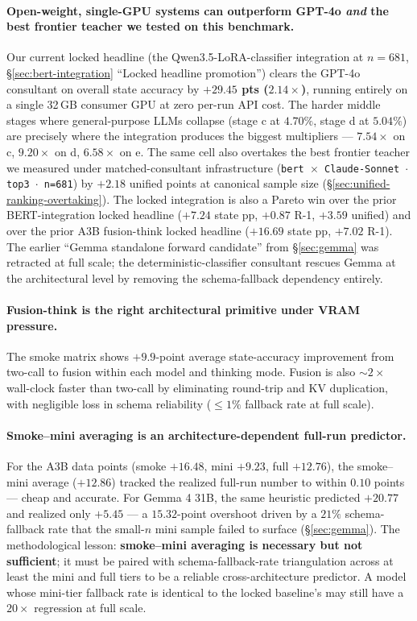 \documentclass[11pt]{article}
\begin{document}
\paragraph{Open-weight, single-GPU systems can outperform GPT-4o \emph{and} the best frontier teacher we tested on this benchmark.} Our current locked headline (the Qwen3.5-LoRA-classifier integration at $n{=}681$, \S\ref{sec:bert-integration} ``Locked headline promotion'') clears the GPT-4o consultant on overall state accuracy by \textbf{$+29.45$ pts ($2.14\times$)}, running entirely on a single 32\,GB consumer GPU at zero per-run API cost. The harder middle stages where general-purpose LLMs collapse (stage c at $4.70\%$, stage d at $5.04\%$) are precisely where the integration produces the biggest multipliers --- $\boldsymbol{7.54\times}$ on c, $\boldsymbol{9.20\times}$ on d, $6.58\times$ on e. The same cell also overtakes the best frontier teacher we measured under matched-consultant infrastructure (\texttt{bert $\times$ Claude-Sonnet $\cdot$ top3 $\cdot$ n=681}) by $\boldsymbol{+2.18}$ unified points at canonical sample size (\S\ref{sec:unified-ranking-overtaking}). The locked integration is also a Pareto win over the prior BERT-integration locked headline ($+7.24$ state pp, $+0.87$ R-1, $+3.59$ unified) and over the prior A3B fusion-think locked headline ($+16.69$ state pp, $+7.02$ R-1). The earlier ``Gemma standalone forward candidate'' from \S\ref{sec:gemma} was retracted at full scale; the deterministic-classifier consultant rescues Gemma at the architectural level by removing the schema-fallback dependency entirely.

\paragraph{Fusion-think is the right architectural primitive under VRAM pressure.} The smoke matrix shows $+9.9$-point average state-accuracy improvement from two-call to fusion within each model and thinking mode. Fusion is also $\sim 2\times$ wall-clock faster than two-call by eliminating round-trip and KV duplication, with negligible loss in schema reliability ($\leq 1\%$ fallback rate at full scale).

\paragraph{Smoke--mini averaging is an architecture-dependent full-run predictor.} For the A3B data points (smoke $+16.48$, mini $+9.23$, full $+12.76$), the smoke--mini average ($+12.86$) tracked the realized full-run number to within $0.10$ points --- cheap and accurate. For Gemma 4 31B, the same heuristic predicted $+20.77$ and realized only $+5.45$ --- a $15.32$-point overshoot driven by a $21\%$ schema-fallback rate that the small-$n$ mini sample failed to surface (\S\ref{sec:gemma}). The methodological lesson: \textbf{smoke--mini averaging is necessary but not sufficient}; it must be paired with schema-fallback-rate triangulation across at least the mini and full tiers to be a reliable cross-architecture predictor. A model whose mini-tier fallback rate is identical to the locked baseline's may still have a $20\times$ regression at full scale.
\end{document}
